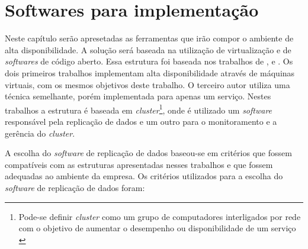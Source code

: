 \chapter{Softwares para implementação}
\label{cap:softwares}




Neste capítulo serão apresetadas as ferramentas que irão compor o ambiente de alta disponibilidade. A solução será baseada na utilização 
de virtualização e de \textit{softwares} de código aberto. Essa estrutura foi baseada nos trabalhos de \citet{goncalves2009}, \citet{reis2009} 
e \citet{zaminhani2008}. Os dois primeiros trabalhos implementam alta disponibilidade através de máquinas virtuais, com os mesmos objetivos deste 
trabalho. O terceiro autor utiliza uma técnica semelhante, porém implementada para apenas um serviço. Nestes trabalhos a estrutura é baseada em 
\textit{cluster}\footnote[1]{Pode-se definir \textit{cluster} como um grupo de computadores interligados por rede com o objetivo de aumentar 
o desempenho ou disponibilidade de um serviço \cite{freitas2005}}, onde é utilizado um \textit{software} responsável pela replicação de dados 
e um outro para o monitoramento e a gerência do \textit{cluster}. 

A escolha do \textit{software} de replicação de dados baseou-se em critérios que fossem compatíveis com as estruturas apresentadas nesses 
trabalhos e que fossem adequadas ao ambiente da empresa. Os critérios utilizados para a escolha do \textit{software} de replicação de dados foram:

